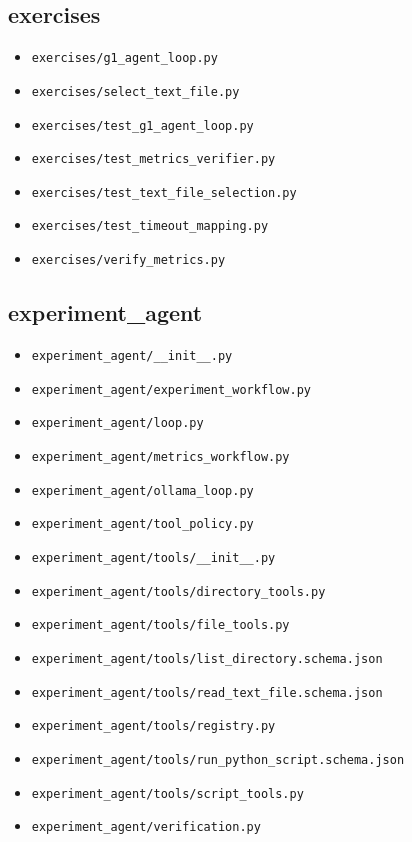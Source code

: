 \documentclass[UTF8,zihao=-4,fontset=fandol]{ctexart}
\begin{document}
\subsection{exercises}
\begin{itemize}
\item \nolinkurl{exercises/g1_agent_loop.py}
\item \nolinkurl{exercises/select_text_file.py}
\item \nolinkurl{exercises/test_g1_agent_loop.py}
\item \nolinkurl{exercises/test_metrics_verifier.py}
\item \nolinkurl{exercises/test_text_file_selection.py}
\item \nolinkurl{exercises/test_timeout_mapping.py}
\item \nolinkurl{exercises/verify_metrics.py}
\end{itemize}

\subsection{experiment\_agent}
\begin{itemize}
\item \nolinkurl{experiment_agent/__init__.py}
\item \nolinkurl{experiment_agent/experiment_workflow.py}
\item \nolinkurl{experiment_agent/loop.py}
\item \nolinkurl{experiment_agent/metrics_workflow.py}
\item \nolinkurl{experiment_agent/ollama_loop.py}
\item \nolinkurl{experiment_agent/tool_policy.py}
\item \nolinkurl{experiment_agent/tools/__init__.py}
\item \nolinkurl{experiment_agent/tools/directory_tools.py}
\item \nolinkurl{experiment_agent/tools/file_tools.py}
\item \nolinkurl{experiment_agent/tools/list_directory.schema.json}
\item \nolinkurl{experiment_agent/tools/read_text_file.schema.json}
\item \nolinkurl{experiment_agent/tools/registry.py}
\item \nolinkurl{experiment_agent/tools/run_python_script.schema.json}
\item \nolinkurl{experiment_agent/tools/script_tools.py}
\item \nolinkurl{experiment_agent/verification.py}
\end{itemize}
\end{document}
